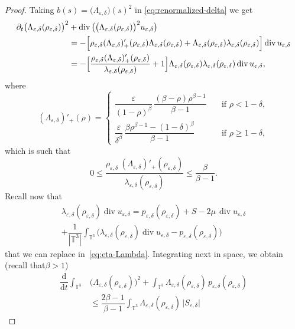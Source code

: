 \documentclass[10pt]{amsart}
\newcommand{\<}{\bigl\langle}
\renewcommand{\>}{\bigr\rangle}
\newcommand{\labeleq}[1]{}
\theoremstyle{definition}
\theoremstyle{remark}
\newcommand{\TT}{\mathbb{T}^3}
\DeclareMathOperator{\Div}{div}
\newcommand{\Dt}{\dfrac{\mathrm{d}}{\mathrm{d} t}}
\let\ep\varepsilon
\begin{document}
\begin{proof}
Taking $b(s) = \big(\Lambda_{\ep,\delta}\big)(s)^2$ in \eqref{eq:renormalized-delta} we get
\begin{equation}\label{eq:eta-Lambda}
\begin{split}
\partial_t\big(\Lambda_{\ep,\delta}(\rho_{\ep,\delta})\big)^2& + \Div\big(\big(\Lambda_{\ep,\delta}(\rho_{\ep,\delta})\big)^2 u_{\ep,\delta} \big)\\
& = - \Big[\rho_{\ep,\delta} (\Lambda_{\ep,\delta})'_+(\rho_{\ep,\delta})\Lambda_{\ep,\delta}(\rho_{\ep,\delta})
+ \Lambda_{\ep,\delta}(\rho_{\ep,\delta}) \lambda_{\ep,\delta}(\rho_{\ep,\delta})
\Big] \Div u_{\ep,\delta} \\
& = - \Bigl[\frac{\rho_{\ep,\delta} (\Lambda_{\ep,\delta})'_+(\rho_{\ep,\delta})}{\lambda_{\ep,\delta}(\rho_{\ep,\delta})} + 1\Bigr]
\Lambda_{\ep,\delta}(\rho_{\ep,\delta})
\lambda_{\ep,\delta}(\rho_{\ep,\delta})\Div u_{\varepsilon, \delta},
\end{split}
\end{equation}
where
\[
(\Lambda_{\ep,\delta})'_+(\rho) =
\begin{cases}
\dfrac{\ep}{(1-\rho)^\beta}\, \dfrac{(\beta-\rho)\rho^{\beta-1}}{\beta-1} \quad&\text{if } \rho < 1-\delta, \\[10pt]
\dfrac{\ep}{\delta^\beta}\, \dfrac{\beta\rho^{\beta-1} - (1-\delta)^\beta}{\beta-1} \quad&\text{if } \rho \geq 1-\delta,
\end{cases}
\]
which is such that
\[
0 \leq \dfrac{\rho_{\ep,\delta} \ (\Lambda_{\ep,\delta})'_+(\rho_{\ep,\delta})}{\lambda_{\ep,\delta}(\rho_{\ep,\delta})}
\leq \dfrac{\beta}{\beta-1}.
\]
Recall now that
\begin{multline*}
\lambda_{\ep,\delta}(\rho_{\ep,\delta})\Div u_{\ep,\delta}
= p_{\ep,\delta} (\rho_{\ep,\delta})
+ S
- 2\mu \, \Div u_{\ep,\delta} \\
+ \dfrac{1}{|\TT|} \int_{\TT}{\big(\lambda_{\ep,\delta}(\rho_{\ep,\delta})\Div u_{\ep,\delta} - p_{\ep,\delta} (\rho_{\ep,\delta}) \big)}
\end{multline*}
that we can replace in~\eqref{eq:eta-Lambda}.
Integrating next in space, we obtain (recall that$\beta > 1$)
\begin{align*}\labeleq{eta-2}
\Dt \int_{\TT}&\big(\Lambda_{\ep,\delta}(\rho_{\ep,\delta})\big)^{2}
+ \int_{\TT}{\Lambda_{\ep,\delta}(\rho_{\ep,\delta})\, p_{\ep,\delta} (\rho_{\ep,\delta})} \\
& \le
\dfrac{2\beta -1}{\beta-1}\int_{\TT}{\Lambda_{\ep,\delta}(\rho_{\ep,\delta})\, |S_{\ep,\delta}}|

\end{align*}
\end{proof}
\end{document}
